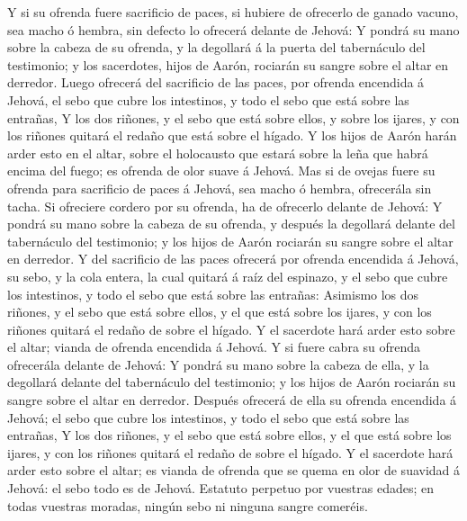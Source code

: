  Y si su ofrenda fuere sacrificio de paces, si hubiere de
ofrecerlo de ganado vacuno, sea macho ó hembra, sin defecto lo ofrecerá
delante de Jehová:  Y pondrá su mano sobre la cabeza de su
ofrenda, y la degollará á la puerta del tabernáculo del testimonio; y
los sacerdotes, hijos de Aarón, rociarán su sangre sobre el altar en
derredor.  Luego ofrecerá del sacrificio de las paces, por
ofrenda encendida á Jehová, el sebo que cubre los intestinos, y todo el
sebo que está sobre las entrañas,  Y los dos riñones, y el
sebo que está sobre ellos, y sobre los ijares, y con los riñones quitará
el redaño que está sobre el hígado.  Y los hijos de Aarón
harán arder esto en el altar, sobre el holocausto que estará sobre la
leña que habrá encima del fuego; es ofrenda de olor suave á Jehová.
 Mas si de ovejas fuere su ofrenda para sacrificio de paces
á Jehová, sea macho ó hembra, ofrecerála sin tacha.  Si
ofreciere cordero por su ofrenda, ha de ofrecerlo delante de Jehová:
 Y pondrá su mano sobre la cabeza de su ofrenda, y después
la degollará delante del tabernáculo del testimonio; y los hijos de
Aarón rociarán su sangre sobre el altar en derredor.  Y del
sacrificio de las paces ofrecerá por ofrenda encendida á Jehová, su
sebo, y la cola entera, la cual quitará á raíz del espinazo, y el sebo
que cubre los intestinos, y todo el sebo que está sobre las entrañas:
 Asimismo los dos riñones, y el sebo que está sobre ellos,
y el que está sobre los ijares, y con los riñones quitará el redaño de
sobre el hígado.  Y el sacerdote hará arder esto sobre el
altar; vianda de ofrenda encendida á Jehová.  Y si fuere
cabra su ofrenda ofrecerála delante de Jehová:  Y pondrá su
mano sobre la cabeza de ella, y la degollará delante del tabernáculo del
testimonio; y los hijos de Aarón rociarán su sangre sobre el altar en
derredor.  Después ofrecerá de ella su ofrenda encendida á
Jehová; el sebo que cubre los intestinos, y todo el sebo que está sobre
las entrañas,  Y los dos riñones, y el sebo que está sobre
ellos, y el que está sobre los ijares, y con los riñones quitará el
redaño de sobre el hígado.  Y el sacerdote hará arder esto
sobre el altar; es vianda de ofrenda que se quema en olor de suavidad á
Jehová: el sebo todo es de Jehová.  Estatuto perpetuo por
vuestras edades; en todas vuestras moradas, ningún sebo ni ninguna
sangre comeréis.

